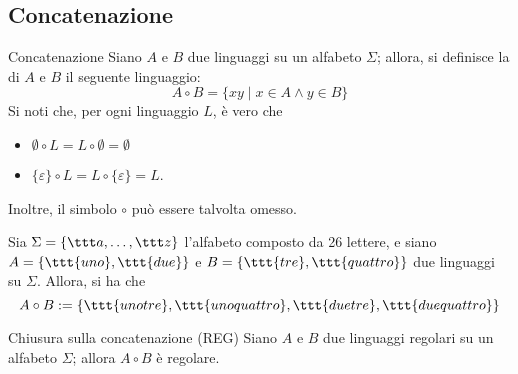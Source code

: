 \documentclass[a4paper, 12pt]{report}
\begin{document}
    \subsection{Concatenazione}

    \begin{frameddefn}{Concatenazione}
        Siano $A$ e $B$ due linguaggi su un alfabeto $\Sigma$; allora, si definisce la  di $A$ e $B$ il seguente linguaggio: $$A \circ B = \{xy \mid x \in A \land y \in B\}$$ Si noti che, per ogni linguaggio $L$, è vero che 

        \begin{itemize}
            \item $\emptyset \circ L = L \circ \emptyset = \emptyset$
            \item $\{\varepsilon \} \circ L = L \circ \{ \varepsilon \} = L$.
        \end{itemize}

        Inoltre, il simbolo $\circ$ può essere talvolta omesso.
    \end{frameddefn}

    \begin{example}[Concatenazione]
        Sia $\Sigma = \{\ttt a , \ldots, \ttt z\}$ l'alfabeto composto da 26 lettere, e siano $A = \{\ttt{uno}, \ttt{due}\}$ e $B = \{\ttt{tre}, \ttt{quattro}\}$ due linguaggi su $\Sigma$. Allora, si ha che $$A \circ B := \{\ttt{unotre}, \ttt{unoquattro}, \ttt{duetre}, \ttt{duequattro}\}$$
    \end{example}

    \begin{framedprop}[label={closure concat}]{Chiusura sulla concatenazione (REG)}
        Siano $A$ e $B$ due linguaggi regolari su un alfabeto $\Sigma$; allora $A \circ B$ è regolare.
    \end{framedprop}
\end{document}
